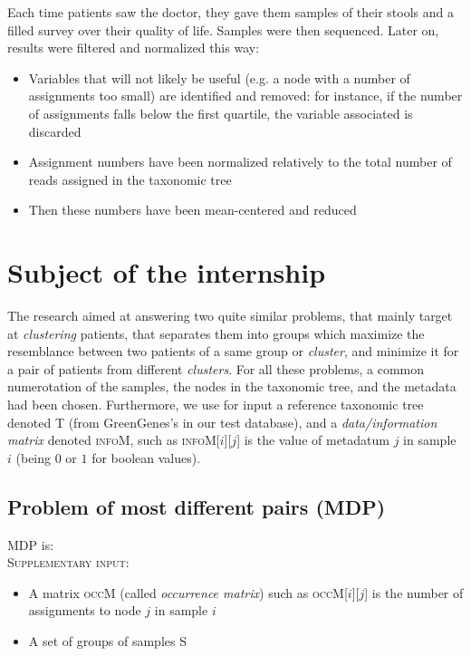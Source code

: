 \documentclass{report}
\begin{document}
Each time patients saw the doctor, they gave them samples of their stools and a filled survey over their quality of life. Samples were then sequenced. Later on, results were filtered and normalized this way:

\begin{itemize}
\item Variables that will not likely be useful (e.g. a node with a number of assignments too small) are identified and removed: for instance, if the number of assignments falls below the first quartile, the variable associated is discarded
\item Assignment numbers have been normalized relatively to the total number of reads assigned in the taxonomic tree
\item Then these numbers have been mean-centered and reduced
\end{itemize}

\newpage

\chapter{Subject of the internship}

The research aimed at answering two quite similar problems, that mainly target at \emph{clustering} patients, that separates them into groups which maximize the resemblance between two patients of a same group or \emph{cluster}, and minimize it for a pair of patients from different \emph{clusters}. For all these problems, a common numerotation of the samples, the nodes in the taxonomic tree, and the metadata had been chosen. Furthermore, we use for input a reference taxonomic tree denoted \textsc{T} (from GreenGenes's in our test database), and a \emph{data/information matrix} denoted \textsc{infoM}, such as \textsc{infoM}[$i$][$j$] is the value of metadatum $j$ in sample $i$ (being $0$ or $1$ for boolean values). 

\section{Problem of most different pairs (MDP)}
\textsc{MDP} is:\\

\textsc{Supplementary input:} 
                \begin{itemize}
                \item A matrix \textsc{occM} (called \emph{occurrence matrix}) such as \textsc{occM}[$i$][$j$] is the number of assignments to node $j$ in sample $i$
                \item A set of groups of samples \textsc{S}
                \end{itemize}
\end{document}
